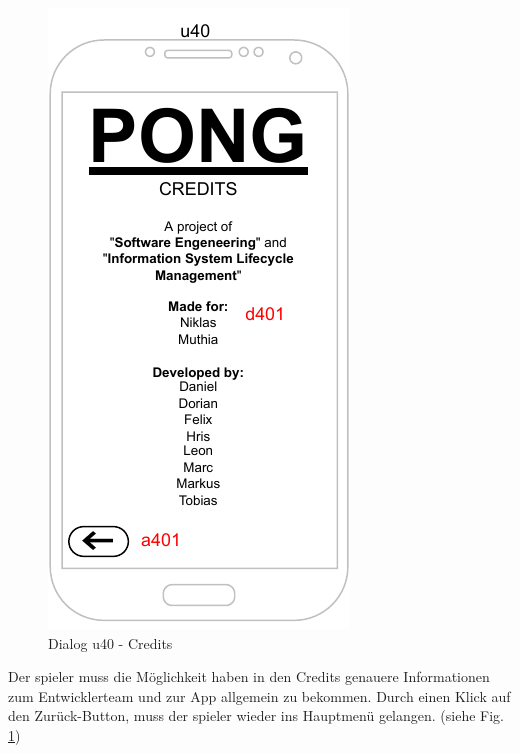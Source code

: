 \begin{figure}[h!]
    \begin{center}
    \includegraphics[scale=1.4]{diagramme/pdf/Mockup-u40.pdf}
    \end{center}
    \caption{Dialog u40 - Credits}\label{fig:dia:u40}
\end{figure}

Der \gls{spieler} muss die Möglichkeit haben in den Credits genauere Informationen zum Entwicklerteam und zur App allgemein zu bekommen.
Durch einen Klick auf den Zurück-Button, muss der \gls{spieler} wieder ins Hauptmenü gelangen.
(siehe Fig. \ref{fig:dia:u40})
\clearpage
